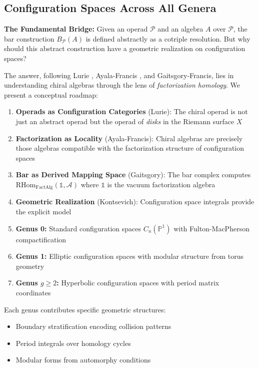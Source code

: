 \subsection{Configuration Spaces Across All Genera}

\noindent\textbf{The Fundamental Bridge:} Given an operad $\mathcal{P}$ and an algebra $A$ over $\mathcal{P}$, 
the bar construction $B_{\mathcal{P}}(A)$ is defined abstractly as a cotriple resolution. But why should 
this abstract construction have a geometric realization on configuration spaces?

The answer, following Lurie \cite{HA}, Ayala-Francis \cite{AF}, and Gaitsgory-Francis, lies in understanding 
chiral algebras through the lens of \emph{factorization homology}. We present a conceptual roadmap:

\begin{enumerate}
\item \textbf{Operads as Configuration Categories} (Lurie): The chiral operad is not just an abstract 
operad but the operad of \emph{disks} in the Riemann surface $X$

\item \textbf{Factorization as Locality} (Ayala-Francis): Chiral algebras are precisely those algebras 
compatible with the factorization structure of configuration spaces

\item \textbf{Bar as Derived Mapping Space} (Gaitsgory): The bar complex computes 
$\text{RHom}_{\text{FactAlg}}(\mathbb{1}, \mathcal{A})$ where $\mathbb{1}$ is the vacuum factorization algebra

\item \textbf{Geometric Realization} (Kontsevich): Configuration space integrals provide the explicit model

\item \textbf{Genus 0:} Standard configuration spaces $C_n(\mathbb{P}^1)$ with Fulton-MacPherson compactification
\item \textbf{Genus 1:} Elliptic configuration spaces with modular structure from torus geometry
\item \textbf{Genus $g \geq 2$:} Hyperbolic configuration spaces with period matrix coordinates
\end{enumerate}

Each genus contributes specific geometric structures:
\begin{itemize}
\item Boundary stratification encoding collision patterns
\item Period integrals over homology cycles
\item Modular forms from automorphy conditions
\end{itemize}

